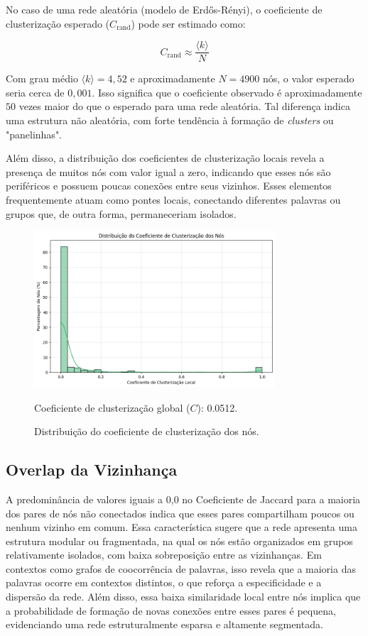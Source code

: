 \documentclass[12pt, a4paper]{article}
\begin{document}
No caso de uma rede aleatória (modelo de Erdős-Rényi), o coeficiente de clusterização esperado ($C_{\text{rand}}$) pode ser estimado como:

\[
C_{\text{rand}} \approx \frac{\langle k \rangle}{N}
\]

Com grau médio $\langle k \rangle = 4{,}52$ e aproximadamente $N = 4900$ nós, o valor esperado seria cerca de $0{,}001$. Isso significa que o coeficiente observado é aproximadamente $50$ vezes maior do que o esperado para uma rede aleatória. Tal diferença indica uma estrutura não aleatória, com forte tendência à formação de \textit{clusters} ou "panelinhas".

Além disso, a distribuição dos coeficientes de clusterização locais revela a presença de muitos nós com valor igual a zero, indicando que esses nós são periféricos e possuem poucas conexões entre seus vizinhos. Esses elementos frequentemente atuam como pontes locais, conectando diferentes palavras ou grupos que, de outra forma, permaneceriam isolados. 

\begin{figure}[H]
    \centering
    \includegraphics[width=0.8\textwidth]{cluster.png}
    \caption{Distribuição do coeficiente de clusterização dos nós.}
    \label{fig:dist_cluster}
Coeficiente de clusterização global ($C$): 0.0512.
\end{figure}


\subsection{Overlap da Vizinhança}
A predominância de valores iguais a 0,0 no Coeficiente de Jaccard para a maioria dos pares de nós não conectados indica que esses pares compartilham poucos ou nenhum vizinho em comum. Essa característica sugere que a rede apresenta uma estrutura modular ou fragmentada, na qual os nós estão organizados em grupos relativamente isolados, com baixa sobreposição entre as vizinhanças. Em contextos como grafos de coocorrência de palavras, isso revela que a maioria das palavras ocorre em contextos distintos, o que reforça a especificidade e a dispersão da rede. Além disso, essa baixa similaridade local entre nós implica que a probabilidade de formação de novas conexões entre esses pares é pequena, evidenciando uma rede estruturalmente esparsa e altamente segmentada.
\end{document}
